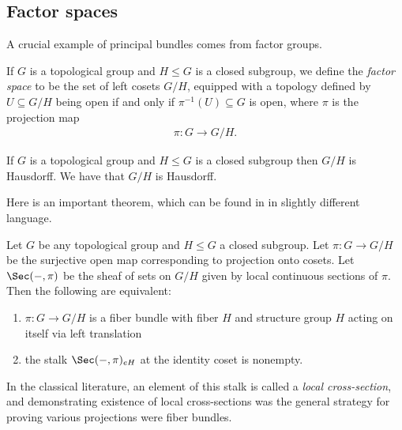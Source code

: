 \documentclass[11pt]{amsart}
\begin{document}
\subsection{Factor spaces}

A crucial example of principal bundles comes from factor groups.

\begin{definition} If $G$ is a topological group and $H \le G$ is a closed subgroup, we define the \emph{factor space} to be the set of left cosets $G/H$, equipped with a topology defined by $U \subseteq G/H$ being open if and only if $\pi^{-1}(U) \subseteq G$ is open, where $\pi$ is the projection map
\begin{align*}
    \pi \colon G \to G/H.
\end{align*}
\end{definition}

\begin{exercise}\label{exer:top-grp-mod-subgp-is-Hausdorff} 
If $G$ is a topological group and $H\le G$ is a closed subgroup then $G/H$ is Hausdorff.
We have that $G/H$ is Hausdorff. %
\end{exercise}

Here is an important theorem, which can be found in \cite[p.~30]{Steenrod-fibre-bundles} in slightly different language.

\begin{theorem} Let $G$ be any topological group and $H \le G$ a closed subgroup. Let $\pi \colon G\to G/H$ be the surjective open map corresponding to projection onto cosets. Let $\Sec(-,\pi)$ be the sheaf of sets on $G/H$ given by local continuous sections of $\pi$. Then the following are equivalent:
\begin{enumerate}
    \item $\pi \colon G \to G/H$ is a fiber bundle with fiber $H$ and structure group $H$ acting on itself via left translation
    \item the stalk $\Sec(-,\pi)_{eH}$ at the identity coset is nonempty.
\end{enumerate}
In the classical literature, an element of this stalk is called a \emph{local cross-section}, and demonstrating existence of local cross-sections was the general strategy for proving various projections were fiber bundles.
\end{theorem}
\end{document}
